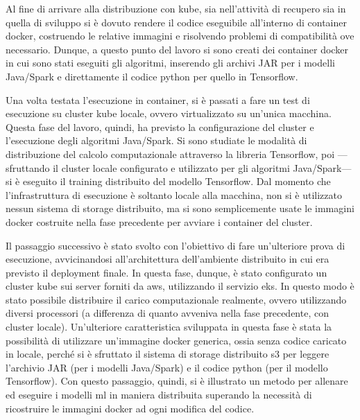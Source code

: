 \documentclass[12pt,a4paper,fleqn,titlepage]{report}
\begin{document}
    Al fine di arrivare alla distribuzione con \gls{kube}, sia nell'attività di recupero sia in quella di sviluppo si è dovuto rendere il codice eseguibile all'interno di \gls{container} \gls{docker}, costruendo le relative immagini e risolvendo problemi di compatibilità ove necessario. Dunque, a questo punto del lavoro si sono creati dei \gls{container} \gls{docker} in cui sono stati eseguiti gli algoritmi, inserendo gli archivi JAR per i modelli Java/Spark e direttamente il codice python per quello in Tensorflow.

    Una volta testata l'esecuzione in \gls{container}, si è passati a fare un test di esecuzione su \gls{cluster} \gls{kube} locale, ovvero virtualizzato su un'unica macchina. Questa fase del lavoro, quindi, ha previsto la configurazione del \gls{cluster} e l'esecuzione degli algoritmi Java/Spark. Si sono studiate le modalità di distribuzione del calcolo computazionale attraverso la libreria Tensorflow, poi —sfruttando il \gls{cluster} locale configurato e utilizzato per gli algoritmi Java/Spark— si è eseguito il training distribuito del modello Tensorflow. Dal momento che l'infrastruttura di esecuzione è soltanto locale alla macchina, non si è utilizzato nessun sistema di storage distribuito, ma si sono semplicemente usate le immagini \gls{docker} costruite nella fase precedente per avviare i \gls{container} del \gls{cluster}.

    Il passaggio successivo è stato svolto con l'obiettivo di fare un'ulteriore prova di esecuzione, avvicinandosi all'architettura dell'ambiente distribuito in cui era previsto il deployment finale. In questa fase, dunque, è stato configurato un cluster \gls{kube} sui server forniti da \gls{aws}, utilizzando il servizio \gls{eks}. In questo modo è stato possibile distribuire il carico computazionale realmente, ovvero utilizzando diversi processori (a differenza di quanto avveniva nella fase precedente, con cluster locale). Un'ulteriore caratteristica sviluppata in questa fase è stata la possibilità di utilizzare un'immagine \gls{docker} generica, ossia senza codice caricato in locale, perché si è sfruttato il sistema di storage distribuito \gls{s3} per leggere l'archivio JAR (per i modelli Java/Spark) e il codice python (per il modello Tensorflow). Con questo passaggio, quindi, si è illustrato un metodo per allenare ed eseguire i modelli \gls{ml} in maniera distribuita superando la necessità di ricostruire le immagini \gls{docker} ad ogni modifica del codice.
\end{document}
